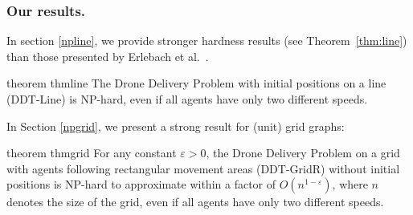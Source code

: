 \subsubsection*{Our results.}

In section \ref{npline}, we provide stronger hardness results (see Theorem~\ref{thm:line}) than those presented by Erlebach et al.~\cite{erlebach:drones}. %
\begin{restatable}{theorem}
{thmline}\label{thm:line} 
The Drone Delivery Problem with initial positions on a line (DDT-Line) is NP-hard, even if all agents have only two different speeds.  
\end{restatable}

In Section \ref{npgrid}, we present a strong result for (unit) grid graphs:  

\begin{restatable}{theorem}
{thmgrid}\label{thm:grid_2speed}  
  For any constant $\varepsilon > 0$, the Drone Delivery Problem on a grid with agents following rectangular movement areas (DDT-GridR) without initial positions is NP-hard to approximate within a factor of $O(n^{1-\varepsilon})$, where $n$ denotes the size of the grid, even if all agents have only two different speeds.  
\end{restatable}


